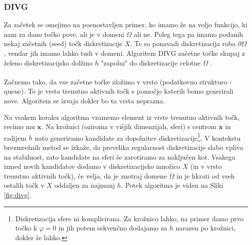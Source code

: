 \documentclass{article}
\begin{document}
\subsubsection{DIVG}
Za začetek se omejimo na poenostavljen primer, ko imamo že na voljo funkcijo, ki nam za dano točko pove, ali je v domeni $\Omega$ ali ne. Poleg tega pa imamo podanih nekaj začetnih (seed) točk diskretizacije $X$. Te so ponavadi diskretizacija roba $\partial \Omega$, vendar jih imamo lahko tudi v domeni. Algoritem DIVG začetne točke skupaj z želeno diskretizacijsko dolžino $h$ "zapolni" do diskretizacije celotne $\Omega$ \cite{divg}.
\\
\\
Začnemo tako, da vse začetne točke zložimo v vrsto (podatkovno strukturo - queue). To je vrsta trenutno aktivnih točk s pomočjo katerih bomo generirali nove. Algoritem se izvaja dokler bo ta vrsta neprazna.

Na vsakem koraku algoritma vzamemo element iz vrste trenutno aktivnih točk, recimo mu $\textbf{x}$. Na krožnici (oziroma v višjih dimenzijah, sferi) s centrom $\textbf{x}$ in radijem $h$ nato generiramo kandidate za dopolnitev diskretizacije\footnote{Diskretizacija sfere ni komplicirana. Za krožnico lahko, na primer damo prvo točko k $\varphi = 0$ in jih potem sekvenčno dodajamo za $h$ narazen po krožnici, dokler še lahko.}. V kontekstu brezmrežnih metod se izkaže, da prevelika regularnost diskretizacije slabo vpliva na stabilnost, zato kandidate na sferi še zarotiramo za naključen kot. Vsakega izmed novih kandidatov dodamo v diskretizacijsko množico $X$ (in v vrsto trenutno aktivnih točk), če velja, da je znotraj domene $\Omega$ in je hkrati od vseh ostalih točk v $X$ oddaljen za najmanj $h$. Potek algoritma je viden na Sliki \ref{fig:divg}.
\end{document}
